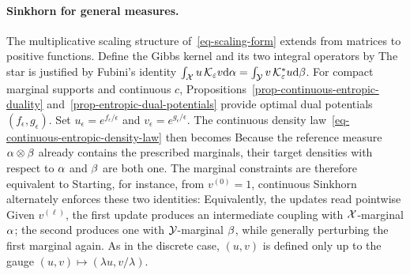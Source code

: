 \paragraph{Sinkhorn for general measures.}

The multiplicative scaling structure of~\eqref{eq-scaling-form} extends from matrices to positive functions. Define the Gibbs kernel and its two integral operators by
The star is justified by Fubini's identity
\(
	\int_{\mathcal{X}} u\,\mathcal K_\varepsilon v\mathrm{d}\alpha
	=
	\int_{\mathcal{Y}} v\,\mathcal K_\varepsilon^*u\mathrm{d}\beta
\).
For compact marginal supports and continuous $c$, Propositions~\ref{prop-continuous-entropic-duality} and~\ref{prop-entropic-dual-potentials} provide optimal dual potentials $(f_\epsilon,g_\epsilon)$. Set $u_\epsilon=e^{f_\epsilon/\epsilon}$ and $v_\epsilon=e^{g_\epsilon/\epsilon}$. The continuous density law~\eqref{eq-continuous-entropic-density-law} then becomes
Because the reference measure $\alpha\otimes\beta$ already contains the prescribed marginals, their target densities with respect to $\alpha$ and $\beta$ are both one. The marginal constraints are therefore equivalent to
Starting, for instance, from $v^{(0)}=1$, continuous Sinkhorn alternately enforces these two identities:
Equivalently, the updates read pointwise
Given $v^{(\ell)}$, the first update produces an intermediate coupling with $\mathcal{X}$-marginal $\alpha$; the second produces one with $\mathcal{Y}$-marginal $\beta$, while generally perturbing the first marginal again. As in the discrete case, $(u,v)$ is defined only up to the gauge $(u,v)\mapsto(\lambda u,v/\lambda)$.

